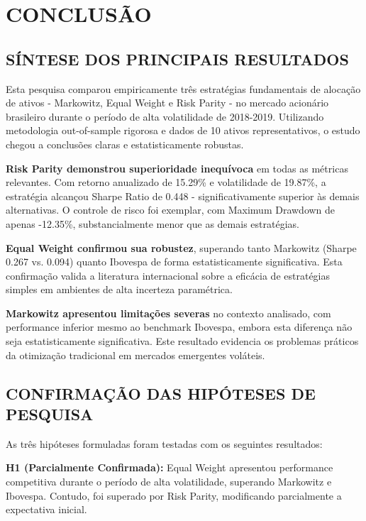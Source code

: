 
\chapter{CONCLUSÃO}

\section{SÍNTESE DOS PRINCIPAIS RESULTADOS}

Esta pesquisa comparou empiricamente três estratégias fundamentais de alocação de ativos - Markowitz, Equal Weight e Risk Parity - no mercado acionário brasileiro durante o período de alta volatilidade de 2018-2019. Utilizando metodologia out-of-sample rigorosa e dados de 10 ativos representativos, o estudo chegou a conclusões claras e estatisticamente robustas.

\textbf{Risk Parity demonstrou superioridade inequívoca} em todas as métricas relevantes. Com retorno anualizado de 15.29\% e volatilidade de 19.87\%, a estratégia alcançou Sharpe Ratio de 0.448 - significativamente superior às demais alternativas. O controle de risco foi exemplar, com Maximum Drawdown de apenas -12.35\%, substancialmente menor que as demais estratégias.

\textbf{Equal Weight confirmou sua robustez}, superando tanto Markowitz (Sharpe 0.267 vs. 0.094) quanto Ibovespa de forma estatisticamente significativa. Esta confirmação valida a literatura internacional sobre a eficácia de estratégias simples em ambientes de alta incerteza paramétrica.

\textbf{Markowitz apresentou limitações severas} no contexto analisado, com performance inferior mesmo ao benchmark Ibovespa, embora esta diferença não seja estatisticamente significativa. Este resultado evidencia os problemas práticos da otimização tradicional em mercados emergentes voláteis.

\section{CONFIRMAÇÃO DAS HIPÓTESES DE PESQUISA}

As três hipóteses formuladas foram testadas com os seguintes resultados:

\textbf{H1 (Parcialmente Confirmada):} Equal Weight apresentou performance competitiva durante o período de alta volatilidade, superando Markowitz e Ibovespa. Contudo, foi superado por Risk Parity, modificando parcialmente a expectativa inicial.


